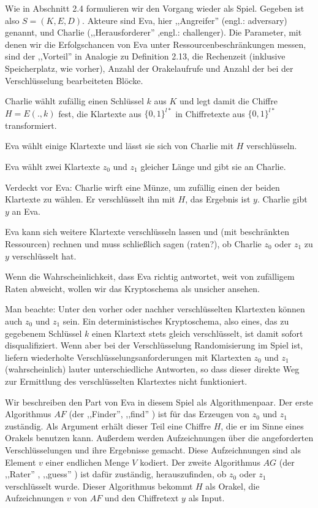 \documentclass[a4paper]{article}
\begin{document}
\begin{multicols}{3}
    Wie in Abschnitt 2.4 formulieren wir den Vorgang wieder als Spiel. Gegeben ist also $S=(K,E,D)$. Akteure sind Eva, hier ,,Angreifer'' (engl.: adversary) genannt, und Charlie (,,Herausforderer'' ,engl.: challenger). Die Parameter, mit denen wir die Erfolgschancen von Eva unter Ressourcenbeschränkungen messen, sind der ,,Vorteil'' in Analogie zu Definition 2.13, die Rechenzeit (inklusive Speicherplatz, wie vorher), Anzahl der Orakelaufrufe und Anzahl der bei der Verschlüsselung bearbeiteten Blöcke.
    \begin{itemize*}
        \item Charlie wählt zufällig einen Schlüssel $k$ aus $K$ und legt damit die Chiffre $H=E(.,k)$ fest, die Klartexte aus $\{0,1\}^{l*}$ in Chiffretexte aus $\{0,1\}^{l*}$ transformiert.
        \item Eva wählt einige Klartexte und lässt sie sich von Charlie mit $H$ verschlüsseln.
        \item Eva wählt zwei Klartexte $z_0$ und $z_1$ gleicher Länge und gibt sie an Charlie.
        \item Verdeckt vor Eva: Charlie wirft eine Münze, um zufällig einen der beiden Klartexte zu wählen. Er verschlüsselt ihn mit $H$, das Ergebnis ist $y$. Charlie gibt $y$ an Eva.
        \item Eva kann sich weitere Klartexte verschlüsseln lassen und (mit beschränkten Ressourcen) rechnen und muss schließlich sagen (raten?), ob Charlie $z_0$ oder $z_1$ zu $y$ verschlüsselt hat.
    \end{itemize*}

    Wenn die Wahrscheinlichkeit, dass Eva richtig antwortet, weit von zufälligem Raten abweicht, wollen wir das Kryptoschema als unsicher ansehen.

    Man beachte: Unter den vorher oder nachher verschlüsselten Klartexten können auch $z_0$ und $z_1$ sein. Ein deterministisches Kryptoschema, also eines, das zu gegebenem Schlüssel $k$ einen Klartext stets gleich verschlüsselt, ist damit sofort disqualifiziert. Wenn aber bei der Verschlüsselung Randomisierung im Spiel ist, liefern wiederholte Verschlüsselungsanforderungen mit Klartexten $z_0$ und $z_1$ (wahrscheinlich) lauter unterschiedliche Antworten, so dass dieser direkte Weg zur Ermittlung des verschlüsselten Klartextes nicht funktioniert.

    Wir beschreiben den Part von Eva in diesem Spiel als Algorithmenpaar. Der erste Algorithmus $AF$ (der ,,Finder'', ,,find'' ) ist für das Erzeugen von $z_0$ und $z_1$ zuständig. Als Argument erhält dieser Teil eine Chiffre $H$, die er im Sinne eines Orakels benutzen kann. Außerdem werden Aufzeichnungen über die angeforderten Verschlüsselungen und ihre Ergebnisse gemacht. Diese Aufzeichnungen sind als Element $v$ einer endlichen Menge $V$ kodiert. Der zweite Algorithmus $AG$ (der ,,Rater'' , ,,guess'' ) ist dafür zuständig, herauszufinden, ob $z_0$ oder $z_1$ verschlüsselt wurde. Dieser Algorithmus bekommt $H$ als Orakel, die Aufzeichnungen $v$ von $AF$ und den Chiffretext $y$ als Input.


\end{multicols}
\end{document}
